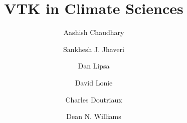 \title{VTK in Climate Sciences}

\author[kitware]{Aashish Chaudhary}

\author[kitware]{Sankhesh J. Jhaveri}

\author[kitware]{Dan Lipsa\corref{}}

\author[kitware]{David Lonie}

\author[llnl]{Charles Doutriaux}

\author[llnl]{Dean N. Williams}

\address[kitware]{Kitware, Inc., 28 Corporate Drive, Clifton Park, NY 12065,
                  USA}
\address[llnl]{Lawrence Livermore National Laboratory, 7000 East Ave.,
               Livermore, CA 94550-9234}

